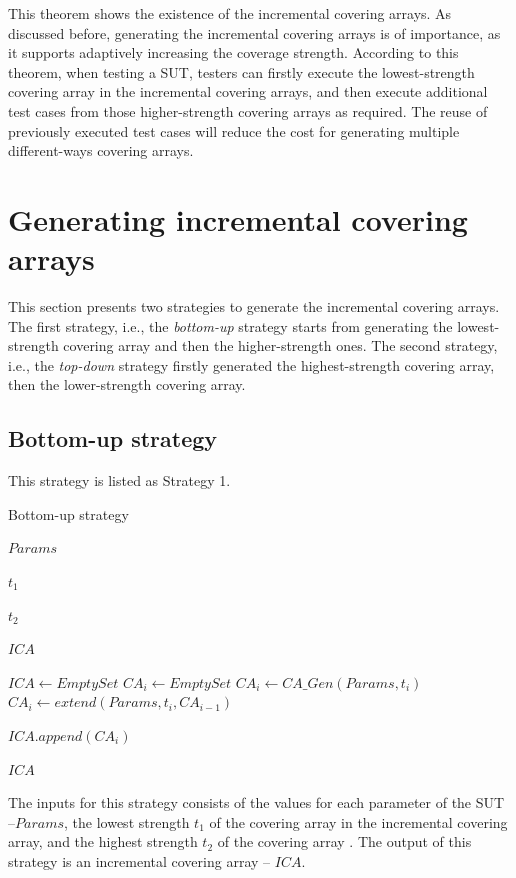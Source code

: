 \documentclass[conference]{IEEEtran}
\theoremstyle{definition}
\begin{document}
This theorem shows the existence of the incremental covering arrays. As discussed before, generating the incremental covering arrays is of importance, as it supports adaptively increasing the coverage strength. According to this theorem, when testing a SUT, testers can firstly execute the lowest-strength covering array in the incremental covering arrays, and then execute additional test cases from those higher-strength covering arrays as required. The reuse of previously executed test cases will reduce the cost for generating multiple different-ways covering arrays.

\section{Generating incremental covering arrays}
This section presents two strategies to generate the incremental covering arrays. The first strategy, i.e., the \emph{bottom-up} strategy starts from generating the lowest-strength covering array and then the higher-strength ones. The second strategy, i.e., the  \emph{top-down} strategy firstly generated the highest-strength covering array, then the lower-strength covering array.

\subsection{Bottom-up strategy}
This strategy is listed as Strategy 1.
\begin{algorithm}
  \caption{Bottom-up strategy}
  \begin{algorithmic}[1]
     \Require
     $Params$ 

     $t_{1}$ 

     $t_{2}$ 

     \Ensure  $ICA$ 

      \State $ICA \leftarrow Empty Set$
         \State $CA_{i} \leftarrow  Empty Set $
                \State $CA_{i} \leftarrow CA\_Gen(Params, t_{i})$
         \Else
             \State $CA_{i} \leftarrow extend(Params, t_{i}, CA_{i - 1})$
        \EndIf

        \State $ICA.append(CA_{i})$
      \EndFor

     \State \Return $ICA$
  \end{algorithmic}
\end{algorithm}
The inputs for this strategy consists of the values for each parameter of the SUT --$Params$,  the lowest strength $t_{1}$ of the covering array in the incremental covering array, and the highest strength $t_{2}$ of the covering array . The output of this strategy is an incremental covering array -- $ICA$.
\end{document}
